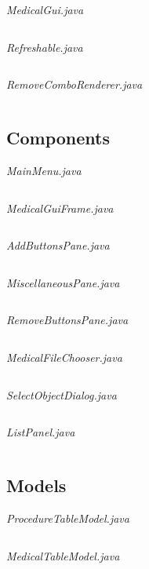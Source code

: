 \documentclass{article}
\begin{document}
\textit{MedicalGui.java}\label{MedicalGui.java}
\inputminted{java}{./src/main/java/com/yvesstraten/medicalconsolegui/MedicalGui.java}

\textit{Refreshable.java}
\inputminted{java}{./src/main/java/com/yvesstraten/medicalconsolegui/Refreshable.java}

\textit{RemoveComboRenderer.java}
\inputminted{java}{./src/main/java/com/yvesstraten/medicalconsolegui/RemoveComboRenderer.java}

\subsection{Components}\label{subsec:components} %
\textit{MainMenu.java}
\inputminted{java}{./src/main/java/com/yvesstraten/medicalconsolegui/components/MainMenu.java}

\textit{MedicalGuiFrame.java}
\inputminted{java}{./src/main/java/com/yvesstraten/medicalconsolegui/components/MedicalGuiFrame.java}

\textit{AddButtonsPane.java}
\inputminted{java}{./src/main/java/com/yvesstraten/medicalconsolegui/components/AddButtonsPane.java}

\textit{MiscellaneousPane.java}
\inputminted{java}{./src/main/java/com/yvesstraten/medicalconsolegui/components/MiscellaneousPane.java}

\textit{RemoveButtonsPane.java}
\inputminted{java}{./src/main/java/com/yvesstraten/medicalconsolegui/components/RemoveButtonsPane.java}

\textit{MedicalFileChooser.java}
\inputminted{java}{./src/main/java/com/yvesstraten/medicalconsolegui/components/MedicalFileChooser.java}

\textit{SelectObjectDialog.java}
\inputminted{java}{./src/main/java/com/yvesstraten/medicalconsolegui/components/SelectObjectDialog.java}

\textit{ListPanel.java}
\inputminted{java}{./src/main/java/com/yvesstraten/medicalconsolegui/components/ListPanel.java}

\subsection{Models}\label{sec:models} %
\textit{ProcedureTableModel.java}
\inputminted{java}{./src/main/java/com/yvesstraten/medicalconsolegui/models/ProcedureTableModel.java}

\textit{MedicalTableModel.java}
\inputminted{java}{./src/main/java/com/yvesstraten/medicalconsolegui/models/MedicalTableModel.java}
\end{document}
